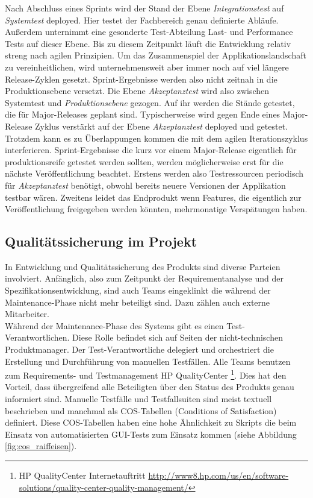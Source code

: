 Nach Abschluss eines Sprints wird der Stand der Ebene \textit{Integrationstest} auf \textit{Systemtest} deployed. Hier testet der Fachbereich genau definierte Abläufe. Außerdem unternimmt eine gesonderte Test-Abteilung Last- und Performance Tests auf dieser Ebene. Bis zu diesem Zeitpunkt läuft die Entwicklung relativ  streng nach agilen Prinzipien. Um das Zusammenspiel der Applikationslandschaft zu vereinheitlichen, wird unternehmensweit aber immer noch auf viel längere Release-Zyklen gesetzt. Sprint-Ergebnisse werden also nicht zeitnah in die Produktionsebene versetzt. Die Ebene \textit{Akzeptanztest} wird also zwischen Systemtest und \textit{Produktionsebene} gezogen. Auf ihr werden die Stände getestet, die für Major-Releases geplant sind. Typischerweise wird gegen Ende eines Major-Release Zyklus verstärkt auf der Ebene \textit{Akzeptanztest} deployed und getestet. Trotzdem kann es zu Überlappungen kommen die mit dem agilen Iterationszyklus interferieren. Sprint-Ergebnisse die kurz vor einem Major-Release eigentlich für produktionsreife getestet werden sollten, werden möglicherweise erst für die nächste Veröffentlichung beachtet. Erstens werden also Testressourcen periodisch für \textit{Akzeptanztest} benötigt, obwohl bereits neuere Versionen der Applikation testbar wären. Zweitens leidet das Endprodukt wenn Features, die eigentlich zur Veröffentlichung freigegeben werden könnten, mehrmonatige Verspätungen haben.

\subsection{Qualitätssicherung im Projekt}
In Entwicklung und Qualitätssicherung des Produkts sind diverse Parteien involviert. Anfänglich, also zum Zeitpunkt der Requirementanalyse und der Spezifikationsentwicklung, sind auch Teams eingeklinkt die während der Maintenance-Phase  nicht mehr beteiligt sind. Dazu zählen auch externe Mitarbeiter.\\
Während der Maintenance-Phase des Systems gibt es einen Test-Verantwortlichen. Diese Rolle befindet sich auf Seiten der nicht-technischen Produktmanager. Der Test-Verantwortliche delegiert und orchestriert die Erstellung und Durchführung von manuellen Testfällen. Alle Teams benutzen zum Requirements- und Testmanagement HP QualityCenter \footnote{HP QualityCenter Internetauftritt \url{http://www8.hp.com/us/en/software-solutions/quality-center-quality-management/}}. Dies hat den Vorteil, dass übergreifend alle Beteiligten über den Status des Produkts genau informiert sind. Manuelle Testfälle und Testfallsuiten sind meist textuell beschrieben und manchmal als COS-Tabellen (Conditions of Satisfaction)  definiert. Diese COS-Tabellen haben eine hohe Ähnlichkeit zu Skripts die beim Einsatz von automatisierten GUI-Tests zum Einsatz kommen (siehe Abbildung \ref{fig:cos_raiffeisen}).

